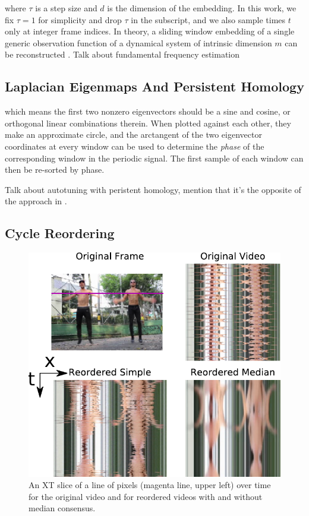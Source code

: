 \documentclass{article}
\begin{document}
where $\tau$ is a step size and $d$ is the dimension of the embedding.  In this work, we fix $\tau = 1$ for simplicity and drop $\tau$ in the subscript, and we also sample times $t$ only at integer frame indices.  In theory, a sliding window embedding of a single generic observation function of a dynamical system of intrinsic dimension $m$ can be reconstructed \cite{takens1981detecting}.
Talk about fundamental frequency estimation \cite{Mcleod05asmarter}



\subsection{Laplacian Eigenmaps And Persistent Homology}
\label{sec:laplacian}

which means the first two nonzero eigenvectors should be a sine and cosine, or orthogonal linear combinations therein.  When plotted against each other, they make an approximate circle, and the arctangent of the two eigenvector coordinates at every window can be used to determine the {\em phase} of the corresponding window in the periodic signal.  The first sample of each window can then be re-sorted by phase.

Talk about autotuning with peristent homology, mention that it's the opposite of the approach in \cite{bendich2011improving}.

\subsection{Cycle Reordering}
\label{sec:cyclereordering}

\begin{figure}[h!]
\centering
\includegraphics[width=0.8\columnwidth]{XTSlice.pdf}
\caption{An XT slice of a line of pixels (magenta line, upper left) over time for the original video and for reordered videos with and without median consensus.}
\label{fig:XTSlice}
\end{figure}
\end{document}
